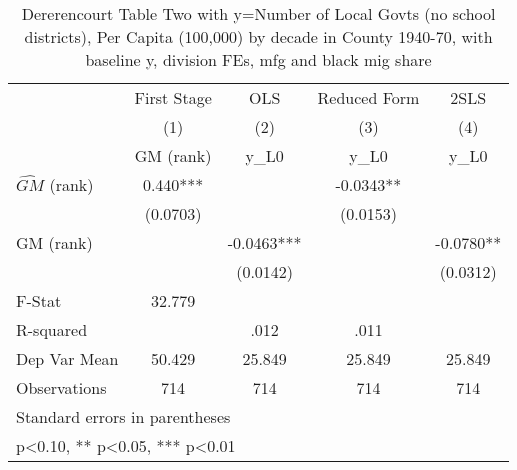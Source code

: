 \begin{table}[htbp]\centering
\def\sym#1{\ifmmode^{#1}\else\(^{#1}\)\fi}
\caption{Dererencourt Table Two with y=Number of Local Govts (no school districts), Per Capita (100,000) by decade in County 1940-70, with baseline y, division FEs, mfg and black mig share}
\begin{tabular}{l*{4}{c}}
\toprule
                    & First Stage   &         OLS   &Reduced Form   &        2SLS   \\
                    &\multicolumn{1}{c}{(1)}&\multicolumn{1}{c}{(2)}&\multicolumn{1}{c}{(3)}&\multicolumn{1}{c}{(4)}\\
                    &\multicolumn{1}{c}{GM  (rank)}&\multicolumn{1}{c}{y\_L0}&\multicolumn{1}{c}{y\_L0}&\multicolumn{1}{c}{y\_L0}\\
\midrule
$\hat{GM}$ (rank)   &       0.440***&               &     -0.0343** &               \\
                    &    (0.0703)   &               &    (0.0153)   &               \\
\addlinespace
GM  (rank)          &               &     -0.0463***&               &     -0.0780** \\
                    &               &    (0.0142)   &               &    (0.0312)   \\
\midrule
F-Stat              &      32.779   &               &               &               \\
R-squared           &               &        .012   &        .011   &               \\
Dep Var Mean        &      50.429   &      25.849   &      25.849   &      25.849   \\
Observations        &         714   &         714   &         714   &         714   \\
\bottomrule
\multicolumn{5}{l}{\footnotesize Standard errors in parentheses}\\
\multicolumn{5}{l}{\footnotesize * p<0.10, ** p<0.05, *** p<0.01}\\
\end{tabular}
\end{table}

